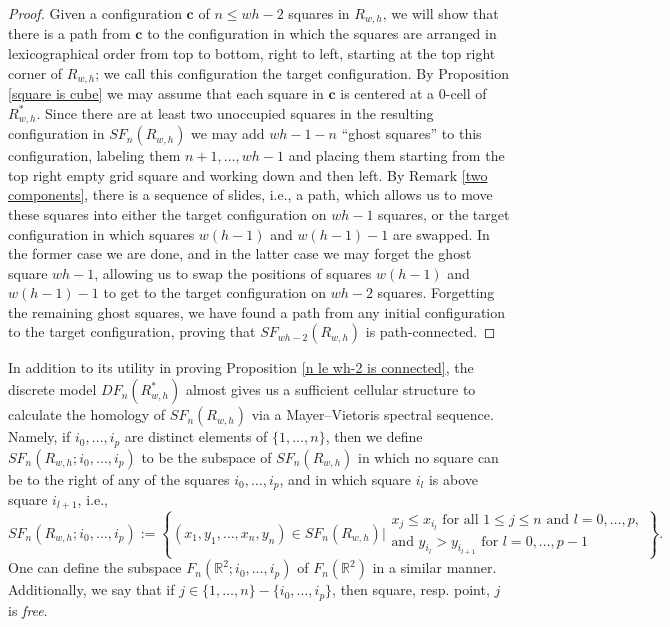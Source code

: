 \documentclass[pagebackref,colorlinks,citecolor=blue,linkcolor=blue,urlcolor=blue,filecolor=blue]{article}
\theoremstyle{definition}\newtheorem{definition}[thm]{Definition}
\theoremstyle{definition}
\newcommand{\R}{\ensuremath{\mathbb{R}}}
\begin{document}
\begin{proof}
Given a configuration $\mathbf{c}$ of $n\le wh-2$ squares in $R_{w,h}$, we will show that there is a path from $\mathbf{c}$ to the configuration in which the squares are arranged in lexicographical order from top to bottom, right to left, starting at the top right corner of $R_{w,h}$; we call this configuration the target configuration.
By Proposition \ref{square is cube} we may assume that each square in $\mathbf{c}$ is centered at a $0$-cell of $R^{*}_{w,h}$.
Since there are at least two unoccupied squares in the resulting configuration in $SF_{n}(R_{w,h})$ we may add $wh-1-n$ ``ghost squares''  to this configuration, labeling them $n+1, \dots, wh-1$ and placing them starting from the top right empty grid square and working down and then left.
By Remark \ref{two components}, there is a sequence of slides, i.e., a path, which allows us to move these squares into either the target configuration on $wh-1$ squares, or the target configuration in which squares $w(h-1)$ and $w(h-1)-1$ are swapped.
In the former case we are done, and in the latter case we may forget the ghost square $wh-1$, allowing us to swap the positions of squares $w(h-1)$ and $w(h-1)-1$ to get to the target configuration on $wh-2$ squares.
Forgetting the remaining ghost squares, we have found a path from any initial configuration to the target configuration, proving that $SF_{wh-2}(R_{w,h})$ is path-connected.
\end{proof}

In addition to its utility in proving Proposition \ref{n le wh-2 is connected}, the discrete model $DF_{n}(R^{*}_{w,h})$ almost gives us a sufficient cellular structure to calculate the homology of $SF_{n}(R_{w,h})$ via a Mayer--Vietoris spectral sequence.
Namely, if $i_{0}, \dots, i_{p}$ are distinct elements of $\{1,\dots, n\}$, then we define $SF_{n}(R_{w,h};i_{0}, \dots, i_{p})$ to be the subspace of $SF_{n}(R_{w,h})$ in which no square can be to the right of any of the squares $i_{0}, \dots, i_{p}$, and in which square $i_{l}$ is above square $i_{l+1}$, i.e.,
\[
SF_{n}(R_{w,h};i_{0}, \dots, i_{p}):=\left\{(x_{1}, y_{1},\dots, x_{n}, y_{n})\in SF_{n}(R_{w,h})\bigg|\substack{{\displaystyle x_{j}\le x_{i_{l}} \text{ for all }1\le j\le n \text{ and } l=0,\dots,p,}\\{\displaystyle\text{and }y_{i_{l}}>y_{i_{l+1}} \text{ for }l=0,\dots, p-1}}\right\}.
\]
One can define the subspace $F_{n}(\R^{2}; i_{0}, \dots, i_{p})$ of $F_{n}(\R^{2})$ in a similar manner.
Additionally, we say that if $j\in \{1,\dots, n\}-\{i_{0},\dots, i_{p}\}$, then square, resp. point, $j$ is \emph{free}.
\end{document}
